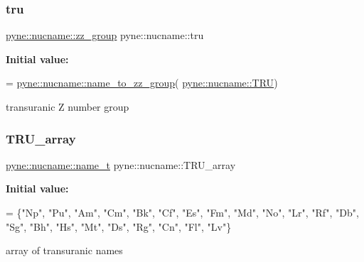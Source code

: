 \subsubsection{\texorpdfstring{tru}{tru}}
{\footnotesize\ttfamily \hyperlink{namespacepyne_1_1nucname_a2e9463e61005389bbc50bfa210061582}{pyne\+::nucname\+::zz\+\_\+group} pyne\+::nucname\+::tru}

{\bfseries Initial value\+:}
\begin{DoxyCode}
= 
  \hyperlink{namespacepyne_1_1nucname_a0f6bd8d281ff5aa5fd5b48e16b867062}{pyne::nucname::name\_to\_zz\_group}(
      \hyperlink{namespacepyne_1_1nucname_adfc1f43df3ea014a500e2c79e0c2f053}{pyne::nucname::TRU})
\end{DoxyCode}


transuranic Z number group 

\mbox{\label{namespacepyne_1_1nucname_ab148461391c413fb7a7176821d65d2e6}} 
\subsubsection{\texorpdfstring{T\+R\+U\+\_\+array}{TRU\_array}}
{\footnotesize\ttfamily \hyperlink{namespacepyne_1_1nucname_aed6b656cde69b79b33f6af37fabb2054}{pyne\+::nucname\+::name\+\_\+t} pyne\+::nucname\+::\+T\+R\+U\+\_\+array}

{\bfseries Initial value\+:}
\begin{DoxyCode}
= \{\textcolor{stringliteral}{"Np"}, \textcolor{stringliteral}{"Pu"}, \textcolor{stringliteral}{"Am"}, \textcolor{stringliteral}{"Cm"},
  \textcolor{stringliteral}{"Bk"}, \textcolor{stringliteral}{"Cf"}, \textcolor{stringliteral}{"Es"}, \textcolor{stringliteral}{"Fm"}, \textcolor{stringliteral}{"Md"}, \textcolor{stringliteral}{"No"}, \textcolor{stringliteral}{"Lr"}, \textcolor{stringliteral}{"Rf"}, \textcolor{stringliteral}{"Db"}, \textcolor{stringliteral}{"Sg"}, \textcolor{stringliteral}{"Bh"}, \textcolor{stringliteral}{"Hs"}, \textcolor{stringliteral}{"Mt"},
  \textcolor{stringliteral}{"Ds"}, \textcolor{stringliteral}{"Rg"}, \textcolor{stringliteral}{"Cn"}, \textcolor{stringliteral}{"Fl"}, \textcolor{stringliteral}{"Lv"}\}
\end{DoxyCode}


array of transuranic names 

